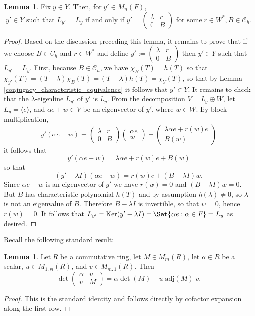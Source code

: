 \documentclass[preprint,11pt]{amsart}
\newcommand{\CalC}{\mathcal{C}}
\theoremstyle{definition}
\numberwithin{thm}{section}
\newtheorem{lem}[thm]{Lemma}
\newcommand{\Ker}{\operatorname{Ker}}
\newcommand{\ip}[1]{\langle #1 \rangle}
\newcommand{\trm}[1]{\textrm{#1}}
\newcommand{\al}{\alpha}
\newcommand{\lam}{\lambda}
\newcommand{\adj}{\textrm{adj}}
\begin{document}
\begin{lem}\label{charY}
Fix $y \in Y$. Then, for $y' \in M_n(F)$,  
$$
y' \in Y \trm{ such that } L_{y'} = L_y \trm{ if and only if } y' = \begin{pmatrix} \lam & r \\ 0 & B \end{pmatrix} \trm{ for some } r \in W^*, B \in \CalC_h.
$$
\end{lem}
\begin{proof}
Based on the discussion preceding this lemma, it remains to prove that if we choose $B \in C_h$ and $r \in W^*$ and define $y' := \begin{pmatrix} \lam & r \\ 0 & B \end{pmatrix}$ then $y' \in Y$ such that $L_{y'} = L_y$. First, because $B \in \CalC_h$, we have $\chi_B(T)= h(T)$ so that $\chi_{y'}(T) = (T- \lam) \chi_B(T) = (T - \lam) h(T) = \chi_Y(T)$, so that by Lemma \ref{conjugacy_characteristic_equivalence} it follows that $y' \in Y$. It remains to check that the $\lam$-eigenline $L_{y'}$ of $y'$ is $L_y$. From the decomposition $V = L_y \oplus W$, let $L_y = \ip{e}$, and $\al e + w \in V$ be an eigenvector of $y'$, where $w \in W$. By block multiplication, 
$$	
y'(\al e + w	) = \begin{pmatrix} \lam & r \\ 0 & B \end{pmatrix} \begin{pmatrix} \al e \\ w \end{pmatrix} = \begin{pmatrix} \lam \al e + r(w)e \\ B(w) \end{pmatrix}
$$
it follows that 
$$
y'(\al e + w ) = \lam \al e + r(w) e + B(w)
$$
so that 
$$
(y' - \lam I)(\al e + w) = r(w) e + (B - \lam I)w.
$$
Since $\al e + w $ is an eigenvector of $y'$ we have $r(w) = 0$ and $(B- \lam I) w = 0$. But $B$ has characteristic polynomial $h(T)$ and by assumption $h(\lam) \neq 0$, so  $\lam$ is not an eigenvalue of $B$. Therefore $B - \lam I$ is invertible, so that $w = 0$, hence $r(w) = 0$. It follows that $L_{y'} = \Ker(y' - \lam I) = \Set{ \al e : \al \in F} = L_y$ as desired.
\end{proof}
Recall the following standard result: 
\begin{lem}\label{schur}
Let $R$ be a commutative ring, let $M \in M_m(R)$, let $\alpha \in R$ be a scalar, $u \in M_{1,m}(R)$, and $v \in M_{m,1}(R)$. Then 
$$
\det \begin{pmatrix} \al & u \\ v & M \end{pmatrix} = \al \det(M) - u \;  \adj(M) \; v.
$$
\end{lem}
\begin{proof}
This is the standard identity and follows directly by cofactor expansion along the first row.
\end{proof}
\end{document}
